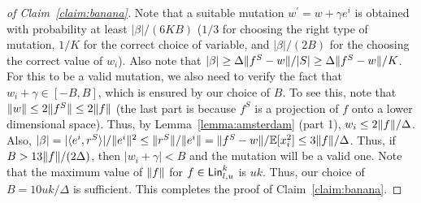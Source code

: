 \begin{proof}[of Claim~\ref{claim:banana}]
Note that a suitable mutation $w^\prime = w + \gamma e^i$ is obtained with
probability at least $|\beta|/(6KB)$ ($1/3$ for choosing the right type of
mutation, $1/K$ for the correct choice of variable, and $|\beta|/(2B)$ for the
choosing the correct value of $w_i$).  Also note that
$|\beta| \geq \Delta \Vert f^S - w \Vert / |S| \geq \Delta \Vert f^S - w \Vert / K$.
For this to be a valid mutation, we also need to verify the fact that $w_i + \gamma
\in [-B, B]$, which is ensured by our choice of $B$. To see this, note that
$\Vert w \Vert \leq 2 \Vert f^S \Vert \leq 2 \Vert f \Vert$ (the last part is
because $f^S$ is a projection of $f$ onto a lower dimensional space). Thus, by
Lemma~\ref{lemma:amsterdam} (part 1), $w_i \leq 2 \Vert f \Vert / \Delta$. Also,
$|\beta| = |\langle e^i, r^S \rangle|/\Vert e^i \Vert^2 \leq \Vert r^S \Vert/\Vert e^i \Vert
= \Vert f^S - w \Vert/\mathbb{E}[x_i^2] \leq 3 \Vert f \Vert/\Delta$.
Thus, if $B > 13 \Vert f \Vert/ (2\Delta)$, then $|w_i + \gamma| < B$ and the
mutation will be a valid one. Note that the maximum value of $\Vert f \Vert$ for
$f \in \mathsf{Lin}^k_{l, u}$ is $uk$. Thus, our choice of $B = 10 uk / \Delta$ is
sufficient.  This completes the proof of Claim~\ref{claim:banana}.
\end{proof}

